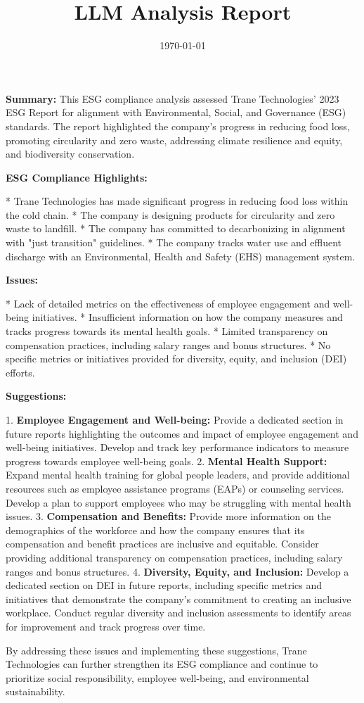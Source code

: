 \documentclass{article}
\title{LLM Analysis Report}
\date{\today}
\begin{document}
                \maketitle

                \textbf{Summary:}
This ESG compliance analysis assessed Trane Technologies' 2023 ESG Report for alignment with Environmental, Social, and Governance (ESG) standards. The report highlighted the company's progress in reducing food loss, promoting circularity and zero waste, addressing climate resilience and equity, and biodiversity conservation.

\textbf{ESG Compliance Highlights:}

* Trane Technologies has made significant progress in reducing food loss within the cold chain.
* The company is designing products for circularity and zero waste to landfill.
* The company has committed to decarbonizing in alignment with "just transition" guidelines.
* The company tracks water use and effluent discharge with an Environmental, Health and Safety (EHS) management system.

\textbf{Issues:}

* Lack of detailed metrics on the effectiveness of employee engagement and well-being initiatives.
* Insufficient information on how the company measures and tracks progress towards its mental health goals.
* Limited transparency on compensation practices, including salary ranges and bonus structures.
* No specific metrics or initiatives provided for diversity, equity, and inclusion (DEI) efforts.

\textbf{Suggestions:}

1. \textbf{Employee Engagement and Well-being:} Provide a dedicated section in future reports highlighting the outcomes and impact of employee engagement and well-being initiatives. Develop and track key performance indicators to measure progress towards employee well-being goals.
2. \textbf{Mental Health Support:} Expand mental health training for global people leaders, and provide additional resources such as employee assistance programs (EAPs) or counseling services. Develop a plan to support employees who may be struggling with mental health issues.
3. \textbf{Compensation and Benefits:} Provide more information on the demographics of the workforce and how the company ensures that its compensation and benefit practices are inclusive and equitable. Consider providing additional transparency on compensation practices, including salary ranges and bonus structures.
4. \textbf{Diversity, Equity, and Inclusion:} Develop a dedicated section on DEI in future reports, including specific metrics and initiatives that demonstrate the company's commitment to creating an inclusive workplace. Conduct regular diversity and inclusion assessments to identify areas for improvement and track progress over time.

By addressing these issues and implementing these suggestions, Trane Technologies can further strengthen its ESG compliance and continue to prioritize social responsibility, employee well-being, and environmental sustainability.

                
\end{document}
